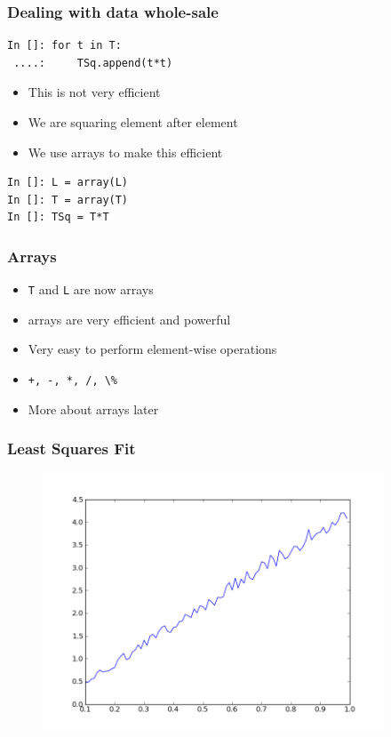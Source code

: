 \documentclass[14pt,compress]{beamer}
\newcommand{\typ}[1]{\lstinline{#1}}
\begin{document}
\begin{frame}[fragile]
\frametitle{Dealing with data whole-sale}
\begin{lstlisting}
In []: for t in T:
 ....:     TSq.append(t*t)
\end{lstlisting}
\begin{itemize}
\item This is not very efficient
\item We are squaring element after element
\item We use arrays to make this efficient
\end{itemize}
\begin{lstlisting}
In []: L = array(L)
In []: T = array(T)
In []: TSq = T*T
\end{lstlisting}
\end{frame}

\begin{frame}[fragile]
\frametitle{Arrays}
\begin{itemize}
\item \typ{T} and \typ{L} are now arrays
\item arrays are very efficient and powerful 
\item Very easy to perform element-wise operations
\item \typ{+, -, *, /, \%}
\item More about arrays later
\end{itemize}
\end{frame}

\begin{frame}[fragile]
\frametitle{Least Squares Fit}
\vspace{-0.15in}
\begin{figure}
\includegraphics[width=4in]{data/L-Tsq-Line.png}
\end{figure}
\end{frame}
\end{document}
